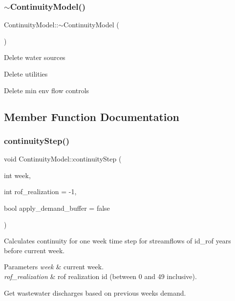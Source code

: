 \mbox{\label{classContinuityModel_a6644d91cc76b2ccc57103aa1a2ab0c03_a6644d91cc76b2ccc57103aa1a2ab0c03}} 
\subsubsection{\texorpdfstring{$\sim$\+Continuity\+Model()}{~ContinuityModel()}}
{\footnotesize\ttfamily Continuity\+Model\+::$\sim$\+Continuity\+Model (\begin{DoxyParamCaption}{ }\end{DoxyParamCaption})\hspace{0.3cm}{\ttfamily [virtual]}}

Delete water sources

Delete utilities

Delete min env flow controls 

\subsection{Member Function Documentation}
\mbox{\label{classContinuityModel_ad880b6cb48eb24e8b78cc5425d85313b_ad880b6cb48eb24e8b78cc5425d85313b}} 
\subsubsection{\texorpdfstring{continuity\+Step()}{continuityStep()}}
{\footnotesize\ttfamily void Continuity\+Model\+::continuity\+Step (\begin{DoxyParamCaption}\item[{int}]{week,  }\item[{int}]{rof\+\_\+realization = {\ttfamily -\/1},  }\item[{bool}]{apply\+\_\+demand\+\_\+buffer = {\ttfamily false} }\end{DoxyParamCaption})}

Calculates continuity for one week time step for streamflows of id\+\_\+rof years before current week. 
\begin{DoxyParams}{Parameters}
{\em week} & current week. \\
\hline
{\em rof\+\_\+realization} & rof realization id (between 0 and 49 inclusive). \\
\hline
\end{DoxyParams}
Get wastewater discharges based on previous week\textquotesingle{}s demand.

